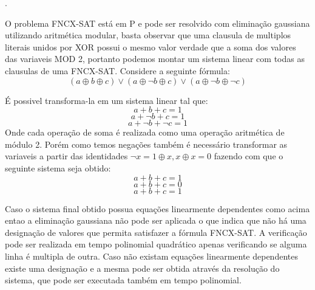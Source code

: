 \documentclass[12pt]{article}
\newcommand{\resposta}[1]{ \noindent {\bf Solução}.{\color{blue} #1}}
\begin{document}
\begin{enumerate}
  \resposta{
     O problema FNCX-SAT está em P e pode ser resolvido com eliminação gaussiana utilizando aritmética modular, basta observar que uma clausula de multiplos literais unidos por XOR possui o mesmo valor verdade que a soma dos valores das variaveis MOD 2, portanto podemos montar um sistema linear com todas as clausulas de uma FNCX-SAT.
    Considere a seguinte fórmula:
        \[ (a \oplus b \oplus c) \lor
        (a \oplus \neg b \oplus c) \lor
        (a \oplus \neg b \oplus \neg c) \]
    
    É possivel transforma-la em um sistema linear tal que:
        \[ a + b + c = 1\]
        \[ a + \neg b + c = 1\]
        \[ a + \neg b + \neg c = 1\]
    Onde cada operação de soma é realizada como uma operação aritmética de módulo 2. Porém como temos negações também é necessário transformar as variaveis a partir das identidades \(\neg x = 1 \oplus x , x \oplus x = 0 \) fazendo com que o seguinte sistema seja obtido:
        \[ a + b + c = 1\]
        \[ a + b + c = 0\]
        \[ a + b + c = 1\]
    
    Caso o sistema final obtido possua equações linearmente dependentes como acima entao a eliminação gaussiana não pode ser aplicada o que indica que não há uma designação de valores que permita satisfazer a fórmula FNCX-SAT. A verificação pode ser realizada em tempo polinomial quadrático apenas verificando se alguma linha é multipla de outra. Caso não existam equações linearmente dependentes existe uma designação e a mesma pode ser obtida através da resolução do sistema, que pode ser executada também em tempo polinomial. 
  }
\end{enumerate}
\end{document}
